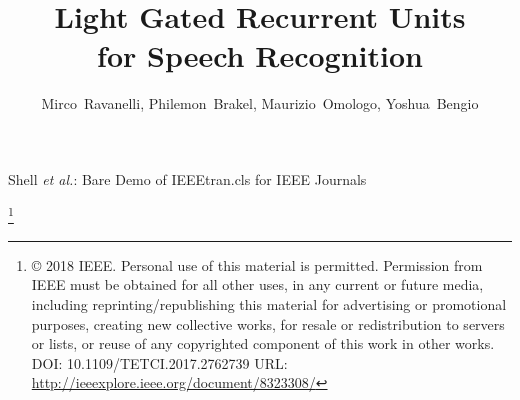 \documentclass[journal]{IEEEtran}
\begin{document}
\title{Light Gated Recurrent Units  \\ for Speech Recognition}


        
\author{Mirco~Ravanelli,
        Philemon~Brakel,
        Maurizio~Omologo,
        Yoshua~Bengio
        }        
        

%
{Shell \MakeLowercase{\textit{et al.}}: Bare Demo of IEEEtran.cls for IEEE Journals}
\maketitle
\footnote{© 2018 IEEE. Personal use of this material is permitted. Permission from IEEE must be obtained for all other uses, in any current or future media, including reprinting/republishing this material for advertising or promotional purposes, creating new collective works, for resale or redistribution to servers or lists, or reuse of any copyrighted component of this work in other works.  DOI: 10.1109/TETCI.2017.2762739 URL: \url{http://ieeexplore.ieee.org/document/8323308/}}
\end{document}
